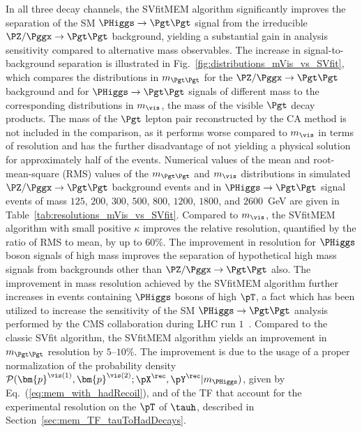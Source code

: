 In all three decay channels, the SVfitMEM algorithm significantly improves the separation of the SM $\PHiggs \to \Pgt\Pgt$ signal 
from the irreducible $\PZ/\Pggx \to \Pgt\Pgt$ background, yielding a substantial gain in analysis sensitivity
compared to alternative mass observables.
The increase in signal-to-background separation is illustrated in
Fig.~\ref{fig:distributions_mVis_vs_SVfit},
which compares the distributions in $m_{\Pgt\Pgt}$ for the $\PZ/\Pggx \to \Pgt\Pgt$ background and for $\PHiggs \to \Pgt\Pgt$ signals of different mass
to the corresponding distributions in $m_{\vis}$,
the mass of the visible $\Pgt$ decay products.
The mass of the $\Pgt$ lepton pair reconstructed by the CA method is not included in the comparison, as it performs worse compared to $m_{\vis}$ in terms of resolution
and has the further disadvantage of not yielding a physical solution
for approximately half of the events.
Numerical values of the mean and root-mean-square (RMS) values
of the $m_{\Pgt\Pgt}$ and $m_{\vis}$ distributions in simulated $\PZ/\Pggx \to \Pgt\Pgt$ background events
and in $\PHiggs \to \Pgt\Pgt$ signal events of mass $125$, $200$, $300$, $500$, $800$, $1200$, $1800$, and $2600$~GeV
are given in Table~\ref{tab:resolutions_mVis_vs_SVfit}.
Compared to $m_{\vis}$,
the SVfitMEM algorithm with small positive $\kappa$ improves the relative resolution,
quantified by the ratio of RMS to mean, by up to $60\%$.
The improvement in resolution for $\PHiggs$ boson signals of high mass improves the separation of hypothetical high mass signals
from backgrounds other than $\PZ/\Pggx \to \Pgt\Pgt$ also.
The improvement in mass resolution achieved by the SVfitMEM algorithm
further increases in events
containing $\PHiggs$ bosons of high $\pT$,
a fact which has been utilized to increase the sensitivity of the SM $\PHiggs \to \Pgt\Pgt$ analysis performed by the CMS collaboration during LHC run $1$~\cite{HIG-13-004}.
Compared to the classic SVfit algorithm, the SVfitMEM algorithm yields an improvement in $m_{\Pgt\Pgt}$ resolution by $5$--$10\%$.
The improvement is due to the usage of a proper normalization of the probability density 
$\mathcal{P}(\bm{p}^{\vis(1)},\bm{p}^{\vis(2)};\pX^{\rec},\pY^{\rec}|m_{\PHiggs})$, given by Eq.~(\ref{eq:mem_with_hadRecoil}),
and of the TF that account for the experimental resolution on the $\pT$ of $\tauh$, described in Section~\ref{sec:mem_TF_tauToHadDecays}.

